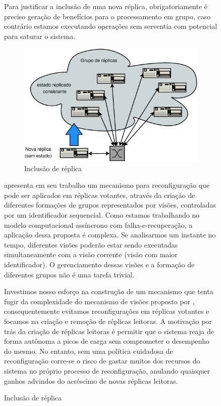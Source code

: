 \begin{figure}[ht]
Para justificar a inclusão de uma nova réplica, obrigatoriamente é preciso geração de
benefícios para o processamento em grupo, caso contrário estamos executando operações sem
serventia com potencial para saturar o sistema.

\begin{figure}[ht]
  \centering
  \includegraphics[width=11cm]{conteudo/capitulos/figuras/inclusao_replica_cluster.eps}
  \caption{Inclusão de réplica}
  \label{fig:inclusao}
\end{figure}

 apresenta em seu trabalho um mecanismo para reconfiguração que pode
ser aplicados em réplicas votantes, através da criação de diferentes formações de grupos
representados por visões, controladas por um identificador sequencial. Como estamos
trabalhando no modelo computacional assíncrono com falha-e-recuperação, a aplicação dessa
proposta é complexa. Se analisarmos um instante no tempo, diferentes visões poderão estar
sendo executadas simultaneamente com a visão corrente (visão com maior identificador). O
gerenciamento dessas visões e a formação de diferentes grupos não é uma tarefa trivial.

Investimos nosso esforço na construção de um mecanismo que tenta fugir da complexidade do
mecanismo de visões proposto por , consequentemente evitamos
reconfigurações em réplicas votantes e focamos na criação e remoção de réplicas leitoras.
A motivação por trás da criação de réplicas leitoras é permitir que o sistema reaja de
forma autônoma a picos de carga sem comprometer o desempenho do mesmo. No entanto, sem uma
política cuidadosa de reconfiguração corre-se o risco de gastar muitos dos recursos do
sistema no próprio processo de reconfiguração, anulando quaisquer ganhos advindos do
acréscimo de novas réplicas leitoras.


\end{figure}
